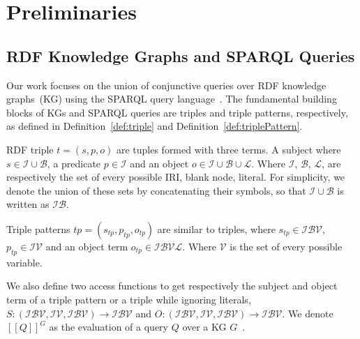 \section{Preliminaries}\label{sec:preliminaries}

\subsection{RDF Knowledge Graphs and SPARQL Queries}

Our work focuses on the union of conjunctive queries over RDF knowledge graphs~(KG) using the SPARQL query language~\cite{w3SPARQLQuery}.
The fundamental building blocks of KGs and SPARQL queries are triples and triple patterns, respectively, as defined in Definition~\ref{def:triple} and Definition~\ref{def:triplePattern}.

\begin{definition}[Triple]\label{def:triple}
    RDF triple $t = (s,p,o)$ are tuples formed with three terms. A subject where $s \in \mathcal{I} \cup \mathcal{B}$, a predicate $p \in \mathcal{I}$ and an object $o \in \mathcal{I}  \cup \mathcal{B} \cup \mathcal{L}$.
    Where $\mathcal{I}$, $\mathcal{B}$, $\mathcal{L}$,  are respectively the set of every possible IRI, blank node, literal.
    For simplicity, we denote the union of these sets by concatenating their symbols, so that $ \mathcal{I} \cup \mathcal{B}$ is written as $ \mathcal{I} \mathcal{B}$.
\end{definition}

\begin{definition}\label{def:triplePattern}
    Triple patterns $tp = (s_{tp}, p_{tp}, o_{tp})$ are similar to triples, where $s_{tp} \in \mathcal{I} \mathcal{B} \mathcal{V}$,
    $p_{tp} \in \mathcal{I} \mathcal{V}$ and an object term  $o_{tp} \in \mathcal{I} \mathcal{B} \mathcal{V} \mathcal{L}$.
    Where $\mathcal{V}$ is the set of every possible variable.
\end{definition}

We also define two access functions to get respectively the subject and object term of a triple pattern or a triple while ignoring literals,
$ S:  (\mathcal{I} \mathcal{B} \mathcal{V}, \mathcal{I} \mathcal{V}, \mathcal{I} \mathcal{B} \mathcal{V}) \rightarrow \mathcal{I} \mathcal{B} \mathcal{V}$ and $O: (\mathcal{I} \mathcal{B} \mathcal{V}, \mathcal{I} \mathcal{V}, \mathcal{I} \mathcal{B} \mathcal{V}) \rightarrow \mathcal{I} \mathcal{B} \mathcal{V}$.
We denote $[\![ Q ]\!]^{G}$ as the evaluation of a query $Q$ over a KG $G$~\cite{Angles2008}.

